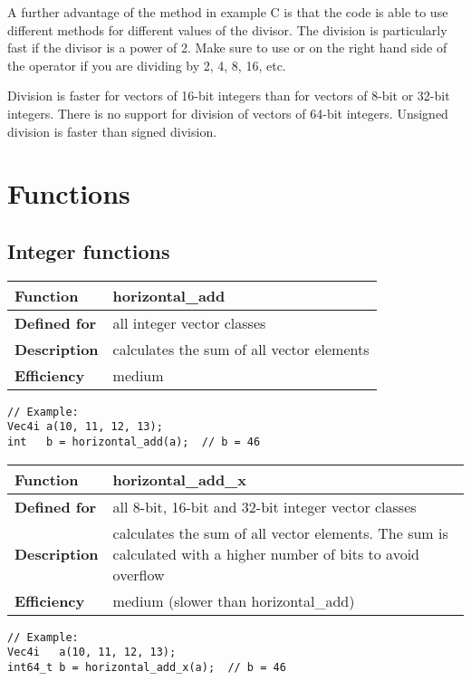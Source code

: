 \documentclass[vcl_manual.tex]{subfiles}
\begin{document}
A further advantage of the method in example C is that the code is able to use different methods for different values of the divisor. The division is particularly fast if the divisor is a power of 2. Make sure to use  or  on the right hand side of the \codei{/} operator if you are dividing by 2, 4, 8, 16, etc.

Division is faster for vectors of 16-bit integers than for vectors of 8-bit or 32-bit integers. There is no support for division of vectors of 64-bit integers. Unsigned division is faster than signed division.


\chapter{Functions}\label{chap:Functions}

\section{Integer functions}
\flushleft

\begin{tabular}{|p{25mm}|p{100mm}|}
\hline
\bfseries Function & horizontal\_add \\ \hline
\bfseries Defined for & all integer vector classes \\ \hline
\bfseries Description & calculates the sum of all vector elements \\ \hline
\bfseries Efficiency & medium \\ \hline
\end{tabular}
\begin{lstlisting}[frame=none]
// Example:
Vec4i a(10, 11, 12, 13);
int   b = horizontal_add(a);  // b = 46
\end{lstlisting}


\begin{tabular}{|p{25mm}|p{100mm}|}
\hline
\bfseries Function & horizontal\_add\_x \\ \hline
\bfseries Defined for & all 8-bit, 16-bit and 32-bit integer vector classes \\ \hline
\bfseries Description & calculates the sum of all vector elements. The sum is calculated with a higher number of bits to avoid overflow
 \\ \hline
\bfseries Efficiency & medium (slower than horizontal\_add) \\ \hline
\end{tabular}
\begin{lstlisting}[frame=none]
// Example:
Vec4i   a(10, 11, 12, 13);
int64_t b = horizontal_add_x(a);  // b = 46
\end{lstlisting}
\end{document}
